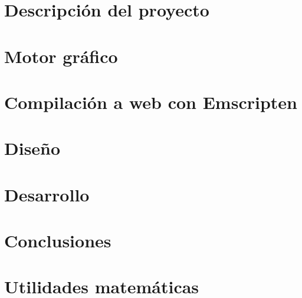 \documentclass{report}
\begin{document}
\chapter{Descripción del proyecto}


\cleardoublepage
\chapter{Motor gráfico}


\cleardoublepage
\chapter{Compilación a web con Emscripten}


\cleardoublepage
\chapter{Diseño}


\cleardoublepage
\chapter{Desarrollo}


\cleardoublepage
\chapter{Conclusiones}


\cleardoublepage
\appendix
\chapter{Utilidades matemáticas}


%
%
\printbibliography
\end{document}
